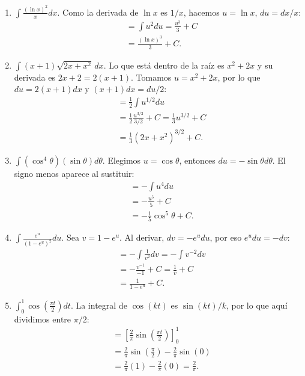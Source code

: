 \documentclass[12pt, letterpaper]{article}
\makeatletter
\renewcommand{\alph}[1]{\expandafter\@alphlatin\csname c@#1\endcsname}
\newcommand{\@alphlatin}[1]{\ifcase#1\or a\or b\or c\or d\or e\or f\or g\or h\or i\or j\or k\or l\or m\or n\or o\or p\or q\or r\or s\or t\or u\or v\or w\or x\or y\or z\else\@ctrerr\fi}
\makeatother
\begin{document}
\begin{enumerate}[label=\alph*)]
  \[
  \begin{aligned}
  &=\frac13\int\frac1u du\\
  &=\frac13\ln|u|+C\\
  &=\boxed{\frac13\ln|x^3+1|+C}.
  \end{aligned}
  \]
  \item $\displaystyle\int\frac{(\ln x)^2}{x}dx$. Como la derivada de $\ln x$ es $1/x$, hacemos $u=\ln x$, $du=dx/x$:
  \[
  \begin{aligned}
  &=\int u^2du=\frac{u^3}{3}+C\\
  &=\boxed{\frac{(\ln x)^3}{3}+C}.
  \end{aligned}
  \]
  \item $\displaystyle\int(x+1)\sqrt{2x+x^2}\,dx$. Lo que está dentro de la raíz es $x^2+2x$ y su derivada es $2x+2=2(x+1)$. Tomamos $u=x^2+2x$, por lo que $du=2(x+1)dx$ y $(x+1)dx=du/2$:
  \[
  \begin{aligned}
  &=\frac12\int u^{1/2}du\\
  &=\frac12\frac{u^{3/2}}{3/2}+C=\frac13u^{3/2}+C\\
  &=\boxed{\frac13(2x+x^2)^{3/2}+C}.
  \end{aligned}
  \]
  \item $\displaystyle\int(\cos^4\theta)(\sin\theta)d\theta$. Elegimos $u=\cos\theta$, entonces $du=-\sin\theta d\theta$. El signo menos aparece al sustituir:
  \[
  \begin{aligned}
  &=-\int u^4du\\
  &=-\frac{u^5}{5}+C\\
  &=\boxed{-\frac15\cos^5\theta+C}.
  \end{aligned}
  \]
  \item $\displaystyle\int\frac{e^u}{(1-e^u)^2}du$. Sea $v=1-e^u$. Al derivar, $dv=-e^u du$, por eso $e^u du=-dv$:
  \[
  \begin{aligned}
  &=-\int\frac1{v^2}dv=-\int v^{-2}dv\\
  &=-\frac{v^{-1}}{-1}+C=\frac1v+C\\
  &=\boxed{\frac1{1-e^u}+C}.
  \end{aligned}
  \]
  \item $\displaystyle\int_0^1\cos\left(\frac{\pi t}{2}\right)dt$. La integral de $\cos(kt)$ es $\sin(kt)/k$, por lo que aquí dividimos entre $\pi/2$:
  \[
  \begin{aligned}
  &=\left[\frac2\pi\sin\left(\frac{\pi t}{2}\right)\right]_0^1\\
  &=\frac2\pi\sin\left(\frac\pi2\right)-\frac2\pi\sin(0)\\
  &=\frac2\pi(1)-\frac2\pi(0)=\boxed{\frac2\pi}.
  \end{aligned}
  \]
\end{enumerate}
\end{document}

